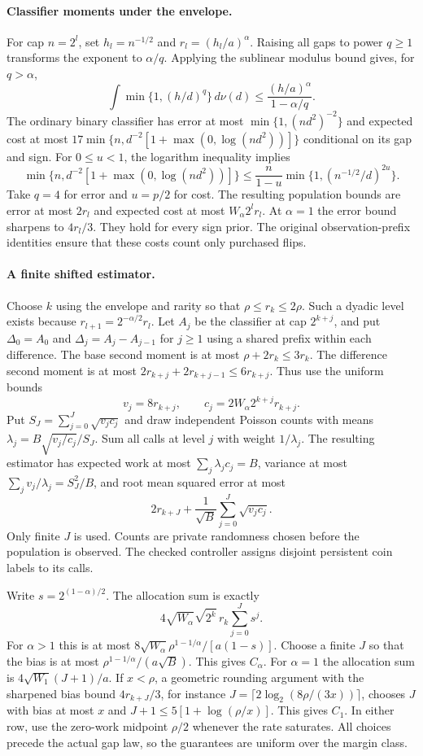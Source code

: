 \paragraph{Classifier moments under the envelope.}
For cap $n=2^l$, set $h_l=n^{-1/2}$ and $r_l=(h_l/a)^\alpha$.
Raising all gaps to power $q\ge1$ transforms the exponent to $\alpha/q$.
Applying the sublinear modulus bound gives, for $q>\alpha$,
\[
 \int\min\{1,(h/d)^q\}\,d\nu(d)
 \le\frac{(h/a)^\alpha}{1-\alpha/q}.
\]
The ordinary binary classifier has error at most
$\min\{1,(nd^2)^{-2}\}$ and expected cost at most
$17\min\{n,d^{-2}[1+\max(0,\log(nd^2))]\}$ conditional on its gap and sign.
For $0\le u<1$, the logarithm inequality implies
\[
 \min\{n,d^{-2}[1+\max(0,\log(nd^2))]\}
 \le\frac{n}{1-u}\min\{1,(n^{-1/2}/d)^{2u}\}.
\]
Take $q=4$ for error and $u=p/2$ for cost. The resulting population
bounds are error at most $2r_l$ and expected cost at most $W_\alpha 2^l r_l$.
At $\alpha=1$ the error bound sharpens to $4r_l/3$.
They hold for every sign prior. The original observation-prefix identities
ensure that these costs count only purchased flips.

\clearpage
\paragraph{A finite shifted estimator.}
Choose $k$ using the envelope and rarity so that $\rho\le r_k\le2\rho$.
Such a dyadic level exists because $r_{l+1}=2^{-\alpha/2}r_l$.
Let $A_j$ be the classifier at cap $2^{k+j}$, and put
$\Delta_0=A_0$ and $\Delta_j=A_j-A_{j-1}$ for $j\ge1$ using
a shared prefix within each difference.
The base second moment is at most $\rho+2r_k\le3r_k$.
The difference second moment is at most $2r_{k+j}+2r_{k+j-1}
\le6r_{k+j}$. Thus use the uniform bounds
\[
 v_j=8r_{k+j},\qquad c_j=2W_\alpha 2^{k+j}r_{k+j}.
\]
Put $S_J=\sum_{j=0}^J\sqrt{v_jc_j}$ and draw independent Poisson counts
with means $\lambda_j=B\sqrt{v_j/c_j}/S_J$. Sum all calls at level $j$
with weight $1/\lambda_j$. The resulting estimator has expected work
at most $\sum_j\lambda_jc_j=B$, variance at most
$\sum_jv_j/\lambda_j=S_J^2/B$, and root mean squared error at most
\[
 2r_{k+J}+\frac1{\sqrt B}\sum_{j=0}^J\sqrt{v_jc_j}.
\]
Only finite $J$ is used. Counts are private randomness chosen before the
population is observed. The checked controller assigns disjoint persistent
coin labels to its calls.

Write $s=2^{(1-\alpha)/2}$. The allocation sum is exactly
\[
 4\sqrt{W_\alpha}\sqrt{2^k}\,r_k\sum_{j=0}^J s^j.
\]
For $\alpha>1$ this is at most
$8\sqrt{W_\alpha}\rho^{1-1/\alpha}/[a(1-s)]$.
Choose a finite $J$ so that the bias is at most
$\rho^{1-1/\alpha}/(a\sqrt B)$. This gives $C_\alpha$.
For $\alpha=1$ the allocation sum is
$4\sqrt{W_1}(J+1)/a$. If $x<\rho$, a geometric rounding argument with the
sharpened bias bound $4r_{k+J}/3$, for instance
$J=\lceil2\log_2(8\rho/(3x))\rceil$, chooses
$J$ with bias at most $x$ and
$J+1\le5[1+\log(\rho/x)]$. This gives $C_1$.
In either row, use the zero-work midpoint $\rho/2$ whenever the rate
saturates. All choices precede the actual gap law, so the guarantees are
uniform over the margin class.

